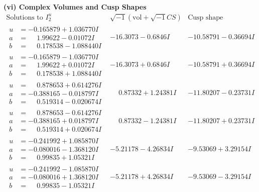 \documentclass[1p]{elsarticle_modified}
\theoremstyle{definition}
\newcommand{\I}{\sqrt{-1}}
\begin{document}
\newpage\flushleft \textbf{(vi) Complex Volumes and Cusp Shapes}
$$\begin{array}{c|c|c}  
\text{Solutions to }I^u_{2}& \I (\text{vol} + \sqrt{-1}CS) & \text{Cusp shape}\\
 \hline 
\begin{aligned}
u &= -0.165879 + 1.036770 I \\
a &= \phantom{-}1.99622 - 0.01072 I \\
b &= \phantom{-}0.178538 - 1.088440 I\end{aligned}
 & -16.3073 - 0.6846 I & -10.58791 - 0.36694 I \\ \hline\begin{aligned}
u &= -0.165879 - 1.036770 I \\
a &= \phantom{-}1.99622 + 0.01072 I \\
b &= \phantom{-}0.178538 + 1.088440 I\end{aligned}
 & -16.3073 + 0.6846 I & -10.58791 + 0.36694 I \\ \hline\begin{aligned}
u &= \phantom{-}0.878653 + 0.614276 I \\
a &= -0.388165 - 0.018797 I \\
b &= \phantom{-}0.519314 - 0.020674 I\end{aligned}
 & \phantom{-}0.87332 + 1.24381 I & -11.80207 - 0.23731 I \\ \hline\begin{aligned}
u &= \phantom{-}0.878653 - 0.614276 I \\
a &= -0.388165 + 0.018797 I \\
b &= \phantom{-}0.519314 + 0.020674 I\end{aligned}
 & \phantom{-}0.87332 - 1.24381 I & -11.80207 + 0.23731 I \\ \hline\begin{aligned}
u &= -0.241992 + 1.085870 I \\
a &= -0.080016 - 1.368120 I \\
b &= \phantom{-}0.99835 + 1.05321 I\end{aligned}
 & -5.21178 - 4.26834 I & -9.53069 + 3.29154 I \\ \hline\begin{aligned}
u &= -0.241992 - 1.085870 I \\
a &= -0.080016 + 1.368120 I \\
b &= \phantom{-}0.99835 - 1.05321 I\end{aligned}
 & -5.21178 + 4.26834 I & -9.53069 - 3.29154 I \\ \hline\begin{aligned}

\end{aligned}
\end{array}$$
\end{document}
